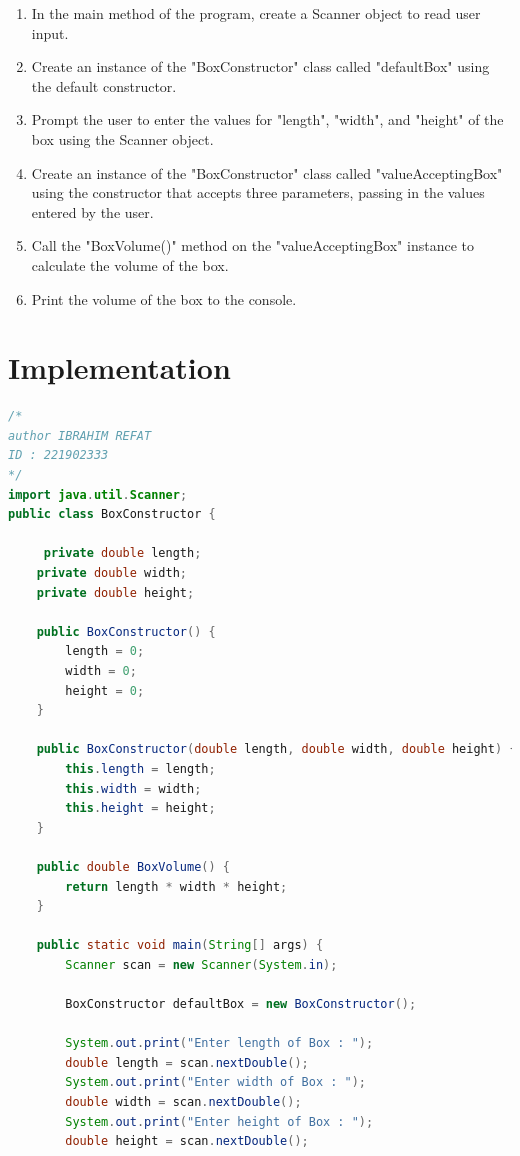\documentclass{report}
\begin{document}
\begin{enumerate}
\begin{enumerate}
\item  In the main method of the program, create a Scanner object to read user input.
\item  Create an instance of the "BoxConstructor" class called "defaultBox" using the default constructor.

\item Prompt the user to enter the values for "length", "width", and "height" of the box using the Scanner object.

\item  Create an instance of the "BoxConstructor" class called "valueAcceptingBox" using the
 constructor that accepts three parameters, passing in the values entered by the user.


\item Call the "BoxVolume()" method on the "valueAcceptingBox" instance to calculate the volume of the box.

\item  Print the volume of the box to the console.



\end{enumerate}

\section{Implementation}
\begin{lstlisting}[language=Java, breaklines=true]
    /*
author IBRAHIM REFAT
ID : 221902333
*/
import java.util.Scanner;
public class BoxConstructor {
    
     private double length;
    private double width;
    private double height;
    
    public BoxConstructor() {
        length = 0;
        width = 0;
        height = 0;
    }
    
    public BoxConstructor(double length, double width, double height) {
        this.length = length;
        this.width = width;
        this.height = height;
    }
    
    public double BoxVolume() {
        return length * width * height;
    }
    
    public static void main(String[] args) {
        Scanner scan = new Scanner(System.in);
        
        BoxConstructor defaultBox = new BoxConstructor();
        
        System.out.print("Enter length of Box : ");
        double length = scan.nextDouble();
        System.out.print("Enter width of Box : ");
        double width = scan.nextDouble();
        System.out.print("Enter height of Box : ");
        double height = scan.nextDouble();
        

\end{lstlisting}
\end{enumerate}
\end{document}
